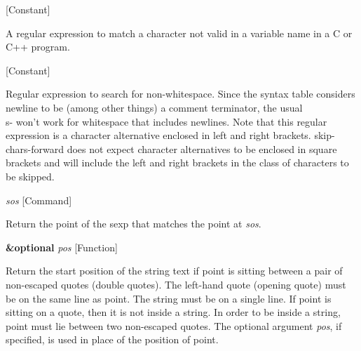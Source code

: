 \vspace{1em}
\noindent
{}
\usebox{\funcname}
 \hfill [Constant]

\begin{doc-string}
A regular expression to match a character not valid in a variable name
in a C or C++ program.
\end{doc-string}

\vspace{1em}
\noindent
{}
\usebox{\funcname}
 \hfill [Constant]

\begin{doc-string}
Regular expression to search for non-whitespace.  Since the syntax table considers
newline to be (among other things) a comment terminator, the usual \\s- won't work
for whitespace that includes newlines.  Note that this regular expression is a
character alternative enclosed in left and right brackets.  skip-chars-forward does
not expect character alternatives to be enclosed in square brackets and will include
the left and right brackets in the class of characters to be skipped.
\end{doc-string}

\vspace{1em}
\noindent
{}
\usebox{\funcname}\emph{sos}
 \hfill [Command]

\begin{doc-string}
Return the point of the sexp that matches the point at \emph{sos}.
\end{doc-string}

\vspace{1em}
\noindent
{}
\usebox{\funcname}\textbf{\&optional} \emph{pos}
 \hfill [Function]

\begin{doc-string}
Return the start position of the string text if point is sitting between a pair
of non-escaped quotes (double quotes).  The left-hand quote (opening quote) must be
on the same line as point.  The string must be on a single line.  If point is sitting
on a quote, then it is not inside a string.  In order to be inside a string, point
must lie between two non-escaped quotes.  The optional argument \emph{pos}, if specified,
is used in place of the position of point.
\end{doc-string}


